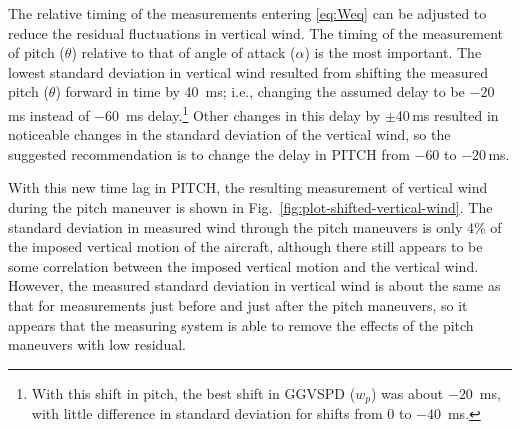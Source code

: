 \documentclass[12pt,twoside,english]{article}\usepackage[]{graphicx}\usepackage[]{color}
\let\OrgIndex\index
\renewcommand*{\index}[1]{\OrgIndex{#1}}
\begin{document}
{{The relative timing of the measurements entering \eqref{eq:Weq} can be adjusted to reduce the residual fluctuations in vertical wind. 
The timing of the measurement of pitch ($\theta$) relative to that of angle of attack ($\alpha$) is the most important. The lowest standard deviation in vertical wind resulted from shifting the measured pitch ($\theta$) forward in time by 40~ms; i.e., changing the assumed delay to be $-20$\,ms instead of $-60$~ms delay.\footnote{With this shift in pitch, 
the best shift in GGVSPD ($w_p$) was about $-20$~ms, with little difference in standard deviation for shifts from 0 to $-40$~ms.}
Other changes in this delay by $\pm$40\,ms resulted in noticeable changes in the
standard deviation of the vertical wind, so 
the suggested recommendation is to change the delay in PITCH from $-60$ to $-20$\,ms. 

With this new time lag in PITCH, the resulting measurement of vertical wind during the pitch maneuver is shown in Fig.~\ref{fig:plot-shifted-vertical-wind}. The standard deviation in measured wind through the pitch maneuvers is only 4\% of the imposed vertical motion of the aircraft, although there still appears to be
some correlation between the imposed vertical motion and the vertical wind.
However, the measured standard deviation in vertical wind is about the same as that for measurements just before and just after the pitch maneuvers, so it appears that the measuring system is able to remove the effects of the pitch maneuvers with low residual. 
% 



}}
\end{document}
